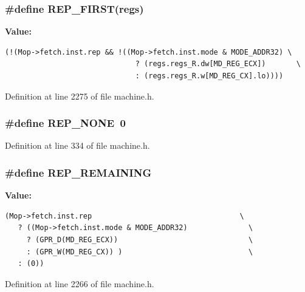 \subsubsection[{REP\_\-FIRST}]{\setlength{\rightskip}{0pt plus 5cm}\#define REP\_\-FIRST(regs)}\label{machine_8h_5bd9bafe6adc2a4581d95dbe5565ed8f}


\textbf{Value:}

\begin{Code}\begin{verbatim}(!(Mop->fetch.inst.rep && !((Mop->fetch.inst.mode & MODE_ADDR32) \
                              ? (regs.regs_R.dw[MD_REG_ECX])       \
                              : (regs.regs_R.w[MD_REG_CX].lo))))
\end{verbatim}
\end{Code}


Definition at line 2275 of file machine.h.
\subsubsection[{REP\_\-NONE}]{\setlength{\rightskip}{0pt plus 5cm}\#define REP\_\-NONE~0}\label{machine_8h_0d8e94cc129e15146f992108219451a3}




Definition at line 334 of file machine.h.
\subsubsection[{REP\_\-REMAINING}]{\setlength{\rightskip}{0pt plus 5cm}\#define REP\_\-REMAINING}\label{machine_8h_549c54919eb30d889c7597527eb866f4}


\textbf{Value:}

\begin{Code}\begin{verbatim}(Mop->fetch.inst.rep                                  \
   ? ((Mop->fetch.inst.mode & MODE_ADDR32)              \
     ? (GPR_D(MD_REG_ECX))                              \
     : (GPR_W(MD_REG_CX)) )                             \
   : (0))
\end{verbatim}
\end{Code}


Definition at line 2266 of file machine.h.
